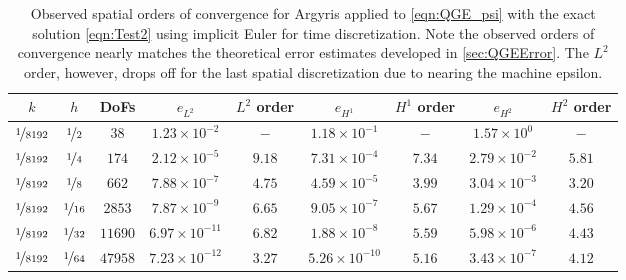 \begin{table}
  \begin{center}
    \begin{tabular}{|c|c|c|c|c|c|c|c|c|}
      \hline
      $k$ & $h$ & DoFs & $e_{L^2}$ & $L^2$ order & $e_{H^1}$ & $H^1$ order & $e_{H^2}$ & $H^2$ order \\
      \hline
      $\nicefrac{1}{8192}$ & $\nicefrac{1}{2}$ & $38$ & $1.23\times 10^{-2}$ & $-$ & $1.18\times 10^{-1}$ & $-$ & $1.57\times 10^0$ & $-$ \\
      $\nicefrac{1}{8192}$ & $\nicefrac{1}{4}$ & $174$ & $2.12\times 10^{-5}$ & $9.18$ & $7.31\times 10^{-4}$ & $7.34$ & $2.79\times 10^{-2}$ & $5.81$ \\
      $\nicefrac{1}{8192}$ & $\nicefrac{1}{8}$ & $662$ & $7.88\times 10^{-7}$ & $4.75$ & $4.59\times 10^{-5}$ & $3.99$ & $3.04\times 10^{-3}$ & $3.20$ \\
      $\nicefrac{1}{8192}$ & $\nicefrac{1}{16}$ & $2853$ & $7.87\times 10^{-9}$ & $6.65$ & $9.05\times 10^{-7}$ & $5.67$ & $1.29\times 10^{-4}$ & $4.56$ \\
      $\nicefrac{1}{8192}$ & $\nicefrac{1}{32}$ & $11690$ & $6.97\times 10^{-11}$ & $6.82$ & $1.88\times 10^{-8}$ & $5.59$ & $5.98\times 10^{-6}$ & $4.43$ \\
      $\nicefrac{1}{8192}$ & $\nicefrac{1}{64}$ & $47958$ & $7.23\times 10^{-12}$ & $3.27$ & $5.26\times 10^{-10}$ & $5.16$ & $3.43\times 10^{-7}$ & $4.12$ \\
      \hline
    \end{tabular}
  \end{center}
  \caption{Observed spatial orders of convergence for Argyris applied to
    \eqref{eqn:QGE_psi} with the exact solution \eqref{eqn:Test2} using implicit
    Euler for time discretization. Note the observed orders of convergence
    nearly matches the theoretical error estimates developed in
    \autoref{sec:QGEError}. The $L^2$ order, however, drops off for the last
    spatial discretization due to nearing the machine epsilon.}
  \label{tab:Test1Space}
\end{table}

